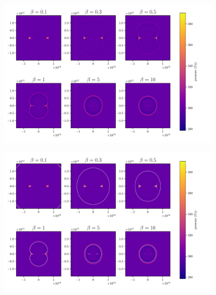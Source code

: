 \documentclass{beamer}
\begin{document}
\begin{frame}
	\begin{figure}[h]
		\centering
		\includegraphics[width=1.1\textwidth]{figures/influence_beta.pdf}
	\end{figure}
\end{frame}
\begin{frame}
	\begin{figure}[h]
		\centering
		\includegraphics[width=1.1\textwidth]{figures/comparison_groupspeed.pdf}
	\end{figure}
\end{frame}
\end{document}
